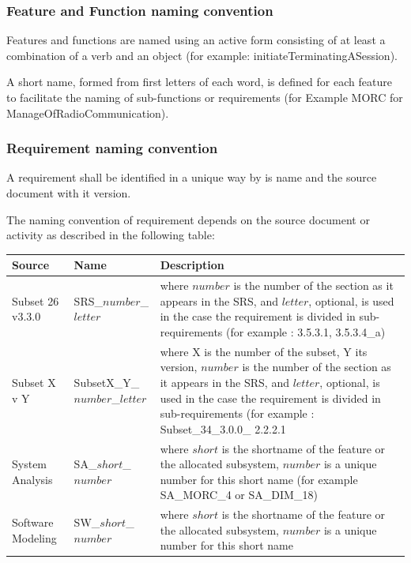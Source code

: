\subsubsection{Feature and Function naming convention}

Features and  functions are named using an active form consisting of at least a combination of a verb and an object (for example:   initiateTerminatingASession).

A short name, formed from first letters of each word, is defined for each feature to  facilitate the naming of sub-functions or requirements (for Example MORC for ManageOfRadioCommunication). 

\subsubsection{Requirement naming convention}

A requirement shall be identified in a unique way by is name and the  source document with it version.

The naming convention of requirement depends on the source document or activity as described in the following table:

\begin{tabular}{|p{2cm} | p{4cm} | p{8cm}|}
\hline 
Source & Name & Description \\
\hline 
Subset 26 v3.3.0 & SRS\_$number$\_$letter$ & where $number$ is the number of the section as it appears in the SRS, and $letter$, optional, is used in the case the requirement is divided in sub-requirements  (for example : 3.5.3.1, 3.5.3.4\_a) \\
\hline 
Subset X v Y & SubsetX\_Y\_$number$\_$letter$ &  where X is the number of the subset, Y its version, $number$ is the number of the section as it appears in the SRS, and $letter$, optional, is used in the case the requirement is divided in sub-requirements (for example : Subset\_34\_3.0.0\_ 2.2.2.1 \\
\hline 
System Analysis & SA\_$short$\_$number$ & where $short$ is the shortname of the feature or the allocated subsystem, $number$ is a unique number for this short name (for example SA\_MORC\_4 or SA\_DIM\_18) \\
\hline 
Software Modeling & SW\_$short$\_$number$ & where $short$ is the shortname of the feature or the allocated subsystem, $number$ is a unique number for this short name \\
\hline
\end{tabular}

